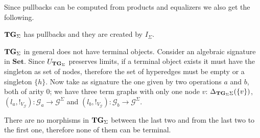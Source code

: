 \documentclass[runningheads,envcountsect]{llncs}
\newcommand{\Set}{\mathbf{Set}}
\newcommand{\catname}[1]{\textbf{\textup{#1}}}
\newcommand{\tg}[0]{\catname{TG}_{\Sigma}}
\begin{document}
Since pullbacks can be computed from products and equalizers we also get the following.

\begin{corollary}\label{cor:pb}$\tg$ has pullbacks and they are created by $I_\Sigma$.
\end{corollary}
\begin{remark}
	$\tg$ in general does not have terminal objects. Consider an algebraic signature in $\Set$. Since $U_{\tg}$ preserves limits, if a terminal object exists it must have the singleton as set of nodes, therefore the set of hyperedges must be empty or a singleton $\{h\}$. Now take as signature the one given by two operations $a$ and $b$, both of arity $0$; we have three term graphs with only one node $v$: $\Delta_{\tg{\Sigma}}(\{v\})$, $(l_a, !_{V_{\mathcal{G}}})\colon \mathcal{G}_a\to \mathcal{G}^{\Sigma}$ and $(l_b, !_{V_{\mathcal{G}}})\colon \mathcal{G}_b\to \mathcal{G}^{\Sigma}$.
	\begin{center}
	\end{center}
	There are no morphisms in $\tg$ between the last two and from the last two to the first one, therefore none of them can be terminal.
\end{remark}
\end{document}
